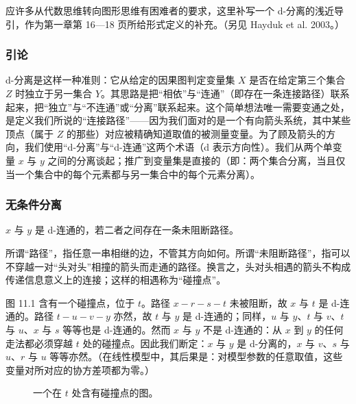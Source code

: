 应许多从代数思维转向图形思维有困难者的要求，这里补写一个 d-分离的浅近导引，作为第一章第 16—18 页所给形式定义的补充。（另见 Hayduk et al. 2003。）

\subsubsection*{引论}

d-分离是这样一种准则：它从给定的因果图判定变量集 $X$ 是否在给定第三个集合 $Z$ 时独立于另一集合 $Y$。其思路是把“相依”与“连通”（即存在一条连接路径）联系起来，把“独立”与“不连通”或“分离”联系起来。这个简单想法唯一需要变通之处，是定义我们所说的“连接路径”——因为我们面对的是一个有向箭头系统，其中某些顶点（属于 $Z$ 的那些）对应被精确知道取值的被测量变量。为了顾及箭头的方向，我们使用“d-分离”与“d-连通”这两个术语（d 表示方向性）。我们从两个单变量 $x$ 与 $y$ 之间的分离谈起；推广到变量集是直接的（即：两个集合分离，当且仅当一个集合中的每个元素都与另一集合中的每个元素分离）。

\subsubsection*{无条件分离}

$x$ 与 $y$ 是 d-连通的，若二者之间存在一条未阻断路径。

所谓“路径”，指任意一串相继的边，不管其方向如何。所谓“未阻断路径”，指可以不穿越一对“头对头”相撞的箭头而走通的路径。换言之，头对头相遇的箭头不构成传递信息意义上的连接；这样的相遇称为“碰撞点”。

\begin{example}\label{ex:11.1.1}
图 11.1 含有一个碰撞点，位于 $t$。路径 $x-r-s-t$ 未被阻断，故 $x$ 与 $t$ 是 d-连通的。路径 $t-u-v-y$ 亦然，故 $t$ 与 $y$ 是 d-连通的；同样，$u$ 与 $y$、$t$ 与 $v$、$t$ 与 $u$、$x$ 与 $s$ 等等也是 d-连通的。然而 $x$ 与 $y$ 不是 d-连通的：从 $x$ 到 $y$ 的任何走法都必须穿越 $t$ 处的碰撞点。因此我们断定：$x$ 与 $y$ 是 d-分离的，$x$ 与 $v$、$s$ 与 $u$、$r$ 与 $u$ 等等亦然。（在线性模型中，其后果是：对模型参数的任意取值，这些变量对所对应的协方差项都为零。）
\end{example}

\begin{figure}[htbp]
\centering
{}
\caption{一个在 $t$ 处含有碰撞点的图。}
\label{fig:11.1}
\end{figure}

